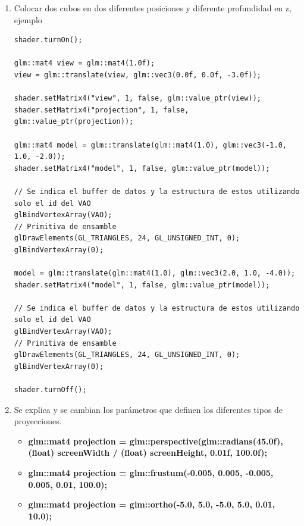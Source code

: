 \documentclass[11pt, english]{article}
\begin{document}
\begin{enumerate}
\item Colocar dos cubos en dos diferentes posiciones y diferente profundidad en z, ejemplo 

\begin{lstlisting}[label={list:third},caption={Ejemplo para colocar dos cubos.}, style=customc]
shader.turnOn();

glm::mat4 view = glm::mat4(1.0f);
view = glm::translate(view, glm::vec3(0.0f, 0.0f, -3.0f));

shader.setMatrix4("view", 1, false, glm::value_ptr(view));
shader.setMatrix4("projection", 1, false, glm::value_ptr(projection));

glm::mat4 model = glm::translate(glm::mat4(1.0), glm::vec3(-1.0, 1.0, -2.0));
shader.setMatrix4("model", 1, false, glm::value_ptr(model));

// Se indica el buffer de datos y la estructura de estos utilizando solo el id del VAO
glBindVertexArray(VAO);
// Primitiva de ensamble
glDrawElements(GL_TRIANGLES, 24, GL_UNSIGNED_INT, 0);
glBindVertexArray(0);

model = glm::translate(glm::mat4(1.0), glm::vec3(2.0, 1.0, -4.0));
shader.setMatrix4("model", 1, false, glm::value_ptr(model));

// Se indica el buffer de datos y la estructura de estos utilizando solo el id del VAO
glBindVertexArray(VAO);
// Primitiva de ensamble
glDrawElements(GL_TRIANGLES, 24, GL_UNSIGNED_INT, 0);
glBindVertexArray(0);

shader.turnOff();
\end{lstlisting}

\item Se explica y se cambian los parámetros que definen los diferentes tipos de
proyecciones.

\begin{itemize}
\item \textbf{glm::mat4 projection = glm::perspective(glm::radians(45.0f), (float) screenWidth / (float) screenHeight, 0.01f, 100.0f);}
\item \textbf{glm::mat4 projection = glm::frustum(-0.005, 0.005, -0.005, 0.005, 0.01, 100.0);}
\item \textbf{glm::mat4 projection = glm::ortho(-5.0, 5.0, -5.0, 5.0, 0.01, 10.0);}
\end{itemize}
\end{enumerate}
\end{document}
